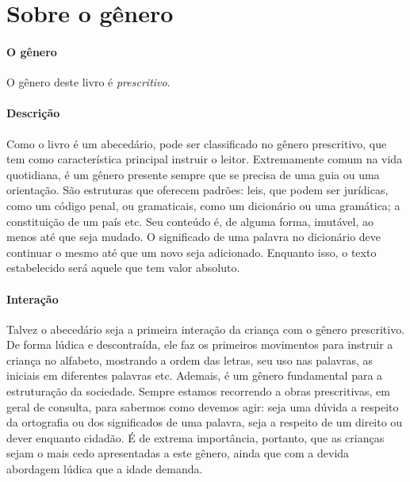 \documentclass[11pt]{extarticle}
\begin{document}
\section{Sobre o gênero}

\paragraph{O gênero} O gênero deste livro é \textit{prescritivo}. 

\paragraph{Descrição} Como o livro é um abecedário, pode ser classificado no gênero prescritivo, que tem como característica principal instruir o leitor.
Extremamente comum na vida quotidiana, é um gênero presente
sempre que se precisa de uma guia ou uma orientação. São estruturas 
que oferecem padrões: leis, que podem ser jurídicas, como um código
penal, ou gramaticais, como um dicionário ou uma gramática; a constituição
de um país etc. Seu conteúdo é, de alguma forma, imutável, ao menos até que seja
mudado. O significado de uma palavra no dicionário deve continuar o mesmo
até que um novo seja adicionado. Enquanto isso, o texto
estabelecido será aquele que tem valor absoluto.

\paragraph{Interação} Talvez o abecedário seja a primeira interação da criança com o gênero prescritivo. De forma lúdica e descontraída, ele faz os primeiros movimentos para instruir a criança no alfabeto, mostrando a ordem das letras, seu uso nas palavras, as iniciais em diferentes palavras etc. Ademais, é um gênero fundamental para a estruturação da sociedade.
Sempre estamos recorrendo a obras prescritivas, em geral de consulta, para
sabermos como devemos agir: seja uma dúvida a respeito da ortografia ou 
dos significados de uma palavra, seja a respeito de um direito ou dever
enquanto cidadão. É de extrema importância, portanto, que as crianças
sejam o mais cedo apresentadas a este gênero, ainda que com a 
devida abordagem lúdica que a idade demanda.

\end{document}
